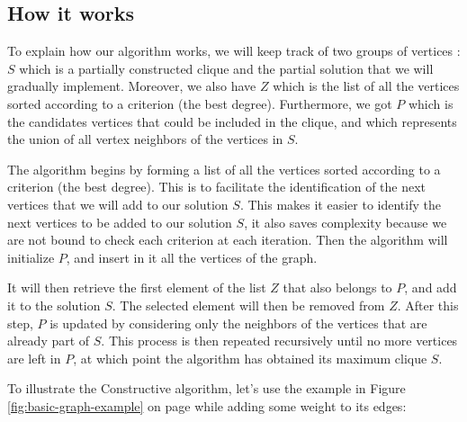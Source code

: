
\subsection{How it works}

To explain how our algorithm works, we will keep track of two groups of vertices : $S$ which is a partially constructed clique and the partial solution that we will gradually implement. Moreover, we also have $Z$ which is the list of all the vertices sorted according to a criterion (the best degree). Furthermore, we got $P$  which is the candidates vertices that could be included in the clique, and which represents the union of all vertex neighbors of the vertices in $S$.
\bigskip

The algorithm begins by forming a list of all the vertices sorted according to a criterion (the best degree). This is to facilitate the identification of the next vertices that we will add to our solution $S$. This makes it easier to identify the next vertices to be added to our solution $S$, it also saves complexity because we are not bound to check each criterion at each iteration. Then the algorithm will initialize $P$, and insert in it all the vertices of the graph.
\bigskip

It will then retrieve the first element of the list $Z$ that also belongs to $P$, and add it to the solution $S$. The selected element will then be removed from $Z$. After this step, $P$ is updated by considering only the neighbors of the vertices that are already part of $S$. This process is then repeated recursively until no more vertices are left in $P$, at which point the algorithm has obtained its maximum clique $S$.
\bigskip

To illustrate the Constructive algorithm, let's use the example in Figure \ref{fig:basic-graph-example} on page \pageref{fig:basic-graph-example} while adding some weight to its edges:
\bigskip

